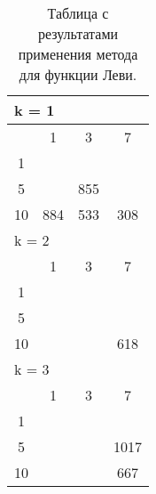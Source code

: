 \begin{table}
  \centering
  \begin{tabular}{|*4{c|}}
    \hline
    \multicolumn{4}{|l|}{k = 1} \\
    \hline
    \diagbox{$\mu$}{$\lambda$} & \multicolumn{1}{c|}{1} & \multicolumn{1}{c|}{3} & \multicolumn{1}{c|}{7} \\
    \hline
    1& \cellcolor{olive}{3496} & \cellcolor{olive}{1980} & \cellcolor{olive}{1321} \\
    \hline
    5& \cellcolor{olive}{1778} & 855 & \cellcolor{olive}{356} \\
    \hline
    10 & 884 & 533 & 308 \\
    \hline
    \multicolumn{4}{|l|}{k = 2} \\
    \hline
    \diagbox{$\mu$}{$\lambda$} & \multicolumn{1}{c|}{1} & \multicolumn{1}{c|}{3} & \multicolumn{1}{c|}{7} \\
    \hline
    1 & \cellcolor{olive}{4947} & \cellcolor{olive}{2020} & \cellcolor{olive}{1205} \\
    \hline
    5 & \cellcolor{olive}{1935} & \cellcolor{olive}{1085} & \cellcolor{olive}{770} \\
    \hline
    10 & \cellcolor{olive}{1803} & \cellcolor{olive}{887} & 618 \\
    \hline
    \multicolumn{4}{|l|}{k = 3} \\
    \hline
    \diagbox{$\mu$}{$\lambda$} & \multicolumn{1}{c|}{1} & \multicolumn{1}{c|}{3} & \multicolumn{1}{c|}{7} \\
    \hline
    1 & \cellcolor{olive}{5216}& \cellcolor{olive}{2900} & \cellcolor{olive}{1700} \\
    \hline
    5 & \cellcolor{olive}{3105} & \cellcolor{olive}{1808} & 1017 \\
    \hline
    10 & \cellcolor{olive}{2071}& \cellcolor{olive}{1330} & 667 \\
    \hline
  \end{tabular}
  \captionsetup{justification=centering}
  \caption{Таблица с результатами применения метода  для функции Леви.}
\end{table}

